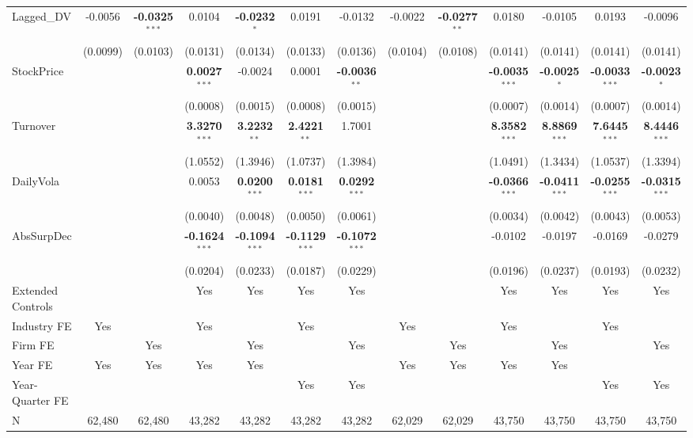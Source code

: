 \begin{landscape}
\begin{table}[H]
\begin{tabular}{lcccccccccccc}
Lagged\_DV & -0.0056 & \textbf{-0.0325}$^{***}$ & 0.0104 & \textbf{-0.0232}$^{*}$ & 0.0191 & -0.0132 & -0.0022 & \textbf{-0.0277}$^{**}$ & 0.0180 & -0.0105 & 0.0193 & -0.0096 \\
 & (0.0099) & (0.0103) & (0.0131) & (0.0134) & (0.0133) & (0.0136) & (0.0104) & (0.0108) & (0.0141) & (0.0141) & (0.0141) & (0.0141) \\
StockPrice &  &  & \textbf{0.0027}$^{***}$ & -0.0024 & 0.0001 & \textbf{-0.0036}$^{**}$ &  &  & \textbf{-0.0035}$^{***}$ & \textbf{-0.0025}$^{*}$ & \textbf{-0.0033}$^{***}$ & \textbf{-0.0023}$^{*}$ \\
 &  &  & (0.0008) & (0.0015) & (0.0008) & (0.0015) &  &  & (0.0007) & (0.0014) & (0.0007) & (0.0014) \\
Turnover &  &  & \textbf{3.3270}$^{***}$ & \textbf{3.2232}$^{**}$ & \textbf{2.4221}$^{**}$ & 1.7001 &  &  & \textbf{8.3582}$^{***}$ & \textbf{8.8869}$^{***}$ & \textbf{7.6445}$^{***}$ & \textbf{8.4446}$^{***}$ \\
 &  &  & (1.0552) & (1.3946) & (1.0737) & (1.3984) &  &  & (1.0491) & (1.3434) & (1.0537) & (1.3394) \\
DailyVola &  &  & 0.0053 & \textbf{0.0200}$^{***}$ & \textbf{0.0181}$^{***}$ & \textbf{0.0292}$^{***}$ &  &  & \textbf{-0.0366}$^{***}$ & \textbf{-0.0411}$^{***}$ & \textbf{-0.0255}$^{***}$ & \textbf{-0.0315}$^{***}$ \\
 &  &  & (0.0040) & (0.0048) & (0.0050) & (0.0061) &  &  & (0.0034) & (0.0042) & (0.0043) & (0.0053) \\
AbsSurpDec &  &  & \textbf{-0.1624}$^{***}$ & \textbf{-0.1094}$^{***}$ & \textbf{-0.1129}$^{***}$ & \textbf{-0.1072}$^{***}$ &  &  & -0.0102 & -0.0197 & -0.0169 & -0.0279 \\
 &  &  & (0.0204) & (0.0233) & (0.0187) & (0.0229) &  &  & (0.0196) & (0.0237) & (0.0193) & (0.0232) \\
\midrule
Extended Controls &  &  & Yes & Yes & Yes & Yes &  &  & Yes & Yes & Yes & Yes \\
Industry FE & Yes &  & Yes &  & Yes &  & Yes &  & Yes &  & Yes &  \\
Firm FE &  & Yes &  & Yes &  & Yes &  & Yes &  & Yes &  & Yes \\
Year FE & Yes & Yes & Yes & Yes &  &  & Yes & Yes & Yes & Yes &  &  \\
Year-Quarter FE &  &  &  &  & Yes & Yes &  &  &  &  & Yes & Yes \\
\midrule
N & 62,480 & 62,480 & 43,282 & 43,282 & 43,282 & 43,282 & 62,029 & 62,029 & 43,750 & 43,750 & 43,750 & 43,750 \\

\end{tabular}
\end{table}
\end{landscape}
